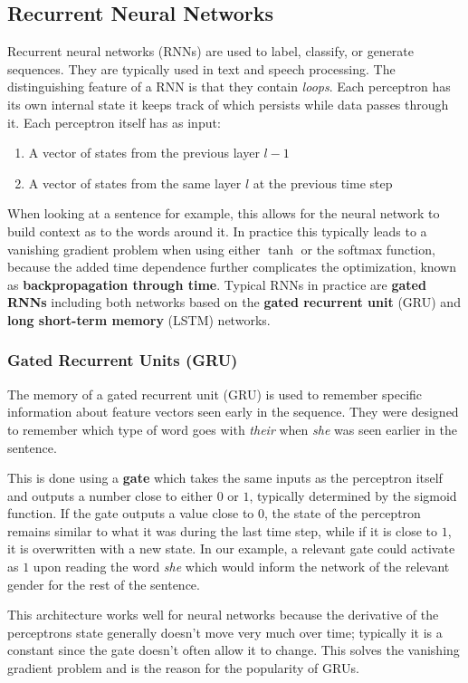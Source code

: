 \subsection{Recurrent Neural Networks}
Recurrent neural networks (RNNs) are used to label, classify, or generate sequences. They are typically used in text and speech processing. The distinguishing feature of a RNN is that they contain \emph{loops}. Each perceptron has its own internal state it keeps track of which persists while data passes through it. Each perceptron itself has as input:
\begin{enumerate}
    \item A vector of states from the previous layer $l-1$
    \item A vector of states from the same layer $l$ at the previous time step
\end{enumerate}
When looking at a sentence for example, this allows for the neural network to build context as to the words around it. In practice this typically leads to a vanishing gradient problem when using either $\tanh$ or the softmax function, because the added time dependence further complicates the optimization, known as \textbf{backpropagation through time}. Typical RNNs in practice are \textbf{gated RNNs} including both  networks based on the \textbf{gated recurrent unit} (GRU) and \textbf{long short-term memory} (LSTM) networks.

\subsubsection{Gated Recurrent Units (GRU)}
The memory of a gated recurrent unit (GRU) is used to remember specific information about feature vectors seen early in the sequence. They were designed to remember which type of word goes with \emph{their} when \emph{she} was seen earlier in the sentence. 

This is done using a \textbf{gate} which takes the same inputs as the perceptron itself and outputs a number close to either $0$ or $1$, typically determined by the sigmoid function. If the gate outputs a value close to $0$, the state of the perceptron remains similar to what it was during the last time step, while if it is close to $1$, it is overwritten with a new state. In our example, a relevant gate could activate as $1$ upon reading the word \emph{she} which would inform the network of the relevant gender for the rest of the sentence.

This architecture works well for neural networks because the derivative of the perceptrons state generally doesn't move very much over time; typically it is a constant since the gate doesn't often allow it to change. This solves the vanishing gradient problem and is the reason for the popularity of GRUs.

